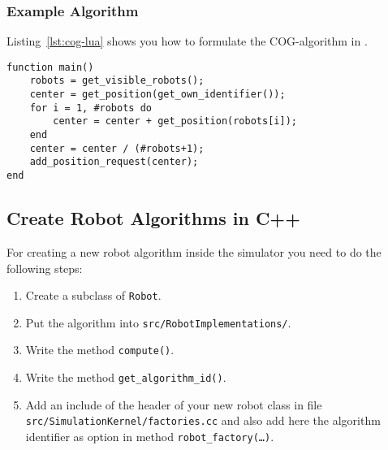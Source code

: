 \subsubsection{Example Algorithm}
Listing~\ref{lst:cog-lua} shows you how to formulate the COG-algorithm in \Lua.

\lstset{language=lua}
\begin{lstlisting}[caption={COG algorithm in \Lua},label=lst:cog-lua]
function main() 
    robots = get_visible_robots();
    center = get_position(get_own_identifier());
    for i = 1, #robots do
        center = center + get_position(robots[i]);
    end
    center = center / (#robots+1);
    add_position_request(center);
end
\end{lstlisting}

\subsection{Create Robot Algorithms in C++}
For creating a new robot algorithm inside the simulator you need to do the following steps:
\begin{enumerate}
	\item Create a subclass of \texttt{Robot}.
	\item Put the algorithm into \texttt{src/RobotImplementations/}.
	\item Write the method \texttt{compute()}.
	\item Write the method \texttt{get\_algorithm\_id()}.
	\item Add an include of the header of your new robot class in file \texttt{src/SimulationKernel/factories.cc} and also add here the algorithm identifier as option in method \texttt{robot\_factory(\dots)}.\\
\end{enumerate}

